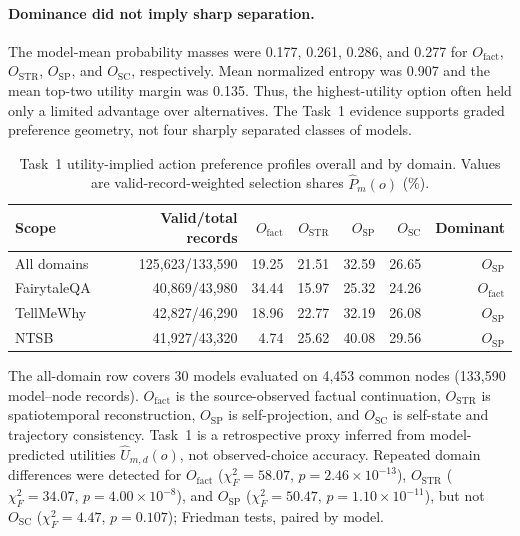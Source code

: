 \documentclass[pdflatex,sn-mathphys-num]{sn-jnl}%
\theoremstyle{thmstyleone}%
\theoremstyle{thmstyletwo}%
\theoremstyle{thmstylethree}%
\begin{document}
\paragraph{Dominance did not imply sharp separation.}
The model-mean probability masses were 0.177, 0.261, 0.286, and 0.277 for $O_{\mathrm{fact}}$, $O_{\mathrm{STR}}$, $O_{\mathrm{SP}}$, and $O_{\mathrm{SC}}$, respectively. Mean normalized entropy was 0.907 and the mean top-two utility margin was 0.135. Thus, the highest-utility option often held only a limited advantage over alternatives. The Task~1 evidence supports graded preference geometry, not four sharply separated classes of models.

\begin{table}[p]
\centering
\caption{Task~1 utility-implied action preference profiles overall and by domain. Values are valid-record-weighted selection shares $\widehat P_m(o)$ (\%).}
\label{tab:preference_profiles}
\small
\setlength{\tabcolsep}{5.0pt}
\begin{tabular}{lrrrrrr}
\toprule
Scope & Valid/total records & $O_{\mathrm{fact}}$ & $O_{\mathrm{STR}}$ & $O_{\mathrm{SP}}$ & $O_{\mathrm{SC}}$ & Dominant \\
\midrule
All domains & 125,623/133,590 & 19.25 & 21.51 & 32.59 & 26.65 & $O_{\mathrm{SP}}$ \\
FairytaleQA & 40,869/43,980 & 34.44 & 15.97 & 25.32 & 24.26 & $O_{\mathrm{fact}}$ \\
TellMeWhy & 42,827/46,290 & 18.96 & 22.77 & 32.19 & 26.08 & $O_{\mathrm{SP}}$ \\
NTSB & 41,927/43,320 & 4.74 & 25.62 & 40.08 & 29.56 & $O_{\mathrm{SP}}$ \\
\bottomrule
\end{tabular}
\begin{minipage}{0.98\textwidth}
\footnotesize
The all-domain row covers 30 models evaluated on 4,453 common nodes (133,590 model--node records). $O_{\mathrm{fact}}$ is the source-observed factual continuation, $O_{\mathrm{STR}}$ is spatiotemporal reconstruction, $O_{\mathrm{SP}}$ is self-projection, and $O_{\mathrm{SC}}$ is self-state and trajectory consistency. Task~1 is a retrospective proxy inferred from model-predicted utilities $\widehat U_{m,d}(o)$, not observed-choice accuracy. Repeated domain differences were detected for $O_{\mathrm{fact}}$ ($\chi_F^2=58.07$, $p=2.46\times10^{-13}$), $O_{\mathrm{STR}}$ ($\chi_F^2=34.07$, $p=4.00\times10^{-8}$), and $O_{\mathrm{SP}}$ ($\chi_F^2=50.47$, $p=1.10\times10^{-11}$), but not $O_{\mathrm{SC}}$ ($\chi_F^2=4.47$, $p=0.107$); Friedman tests, paired by model.
\end{minipage}
\end{table}
\end{document}
